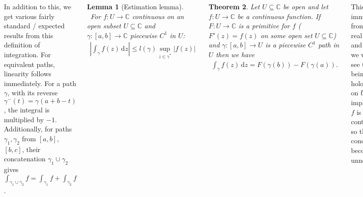 \documentclass{tikzposter} %
\newtheorem{theorem}{Theorem}
\newtheorem{lemma}[theorem]{Lemma}
\begin{document}
\begin{columns}
{  In addition to this, we get various fairly standard / expected results from this definition of integration. For equivalent paths, linearity follows immediately. For a path $\gamma$, with its reverse $\gamma^{-}(t) = \gamma(a+b-t)$, the integral is multiplied by $-1$. Additionally, for paths $\gamma_{1}, \gamma_{2}$ from $[a,b]$, $[b,c]$, their concatenation $\gamma_{1} \cup \gamma_{2}$ gives $\int_{\gamma_{1} \cup \gamma_{2}} f = \int_{\gamma_{1}} f + \int_{\gamma_{2}} f$.\\

  \begin{lemma}[Estimation lemma]
    \ For $f : U \to \mathbb{C}$ continuous on an open subset $U \subseteq \mathbb{C}$ and $\gamma : [a,b] \to \mathbb{C}$ piecewise $C^{1}$ in $U$:
    \begin{align*}
      \left|\int_{\gamma} f(z) \, \mathrm{d}z \right| \le l(\gamma)\sup_{z \in \gamma^{*}} |f(z)|
    \end{align*}
  \end{lemma}
  \hphantom{}

  \begin{theorem}
    Let $U \subseteq \mathbb{C}$ be open and let $f : U \to \mathbb{C}$ be a continuous function. If $F : U \to \mathbb{C}$ is a primitive for $f$ ($F'(z) = f(z)$ on some open set $U \subseteq \mathbb{C}$) and $\gamma : [a,b] \to U$ is a piecewise $C^{1}$ path in $U$ then we have
    \begin{align*}
      \int_{\gamma} f(z) \, \mathrm{d} z = F(\gamma(b)) - F(\gamma(a)).
    \end{align*}
  \end{theorem}
  \hphantom{}

  This follows immediately from the real FTC, and indeed we will later see that $F$ being holomorphic on $U$ implies that $f$ is continuous, so that condition becomes unnecessary. \\

  \begin{theorem}
    If $U$ is a domain and $f : U \to \mathbb{C}$ is a continuous function such that for any closed piecewise $C^{1}$ path in $U$ we have $\int_{\gamma} f(z) \, \mathrm{d}z = 0$, then $f$ has a primitive.
  \end{theorem}
  \hphantom{}

  \begin{lemma}
    Suppose $f_{n} \overset{u}{\to} f$ on $\gamma$. Then
    \begin{align*}
      \lim_{n \to \infty} \int_{\gamma} f_{n}(z) \, \mathrm{d}z &= \int_{\gamma} f(z) \, \mathrm{d}z
    \end{align*}
  \end{lemma}
  \hphantom{}

}
\end{columns}
\end{document}
